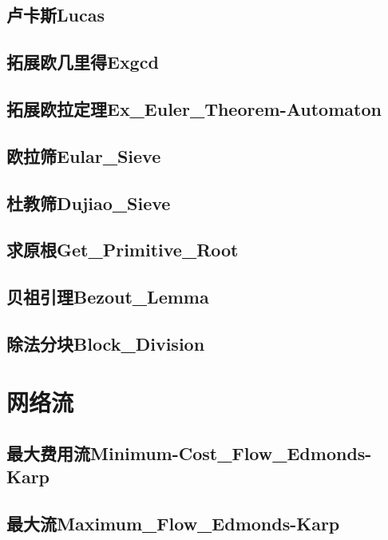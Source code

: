 \documentclass[10pt,a4paper]{article}
\begin{document}
\subsection{卢卡斯Lucas}

\subsection{拓展欧几里得Exgcd}

\subsection{拓展欧拉定理Ex\_Euler\_Theorem-Automaton}

\subsection{欧拉筛Eular\_Sieve}

\subsection{杜教筛Dujiao\_Sieve}

\subsection{求原根Get\_Primitive\_Root}

\subsection{贝祖引理Bezout\_Lemma}

\subsection{除法分块Block\_Division}


\newpage
\section{网络流}
\subsection{最大费用流Minimum-Cost\_Flow\_Edmonds-Karp}

\subsection{最大流Maximum\_Flow\_Edmonds-Karp}

\end{document}
